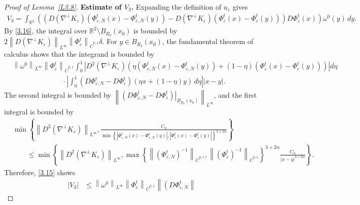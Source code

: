 \documentclass[reqno,centertags,12pt]{amsart}
\theoremstyle{definition}
\numberwithin{equation}{section}
\newcommand{\abs}[1]{\left\lvert#1\right\rvert}
\newcommand{\norm}[1]{\left\|#1\right\|}
\newcommand{\set}[1]{\left\{ #1 \right\}}
\newcommand{\bbR}{{\mathbb{R}}}
\newcommand{\eps}{\varepsilon}
\begin{document}
\begin{proof}[Proof of Lemma~\ref{L3.8}]
    \textbf{Estimate of $V_{3}$.} Expanding the definition of $u_{\eps}$ gives
    \begin{align*}
        V_{3} = \int_{\bbR^{2}}\left(\left(
            D(\nabla^{\perp}K_{\eps})
            (\Phi_{\eps,N}^{t}(x) - \Phi_{\eps,N}^{t}(y))
            - D(\nabla^{\perp}K_{\eps})
            (\Phi_{\eps}^{t}(x) - \Phi_{\eps}^{t}(y))
        \right)D\Phi_{\eps}^{t}(x)\right)
        \omega^{0}(y)\,dy.
    \end{align*}
    By \eqref{3.16}, the integral over $\bbR^{2}\setminus B_{R_{\delta}}(x_{0})$ is bounded by
    $2\norm{D(\nabla^{\perp}K_{\eps})}_{L^{\infty}}\norm{\Phi_{\eps}^{t}}_{\dot{C}^{0,1}}\delta$.
    For $y\in B_{R_{\delta}}(x_{0})$, the fundamental theorem of calculus shows that
    the integrand is bounded by
    \begin{align*}
        &\norm{\omega^{0}}_{L^{\infty}}\norm{\Phi_{\eps}^{t}}_{\dot{C}^{0,1}}
        \int_{0}^{1}\abs{D^{2}(\nabla^{\perp}K_{\eps})
        (\eta(\Phi_{\eps,N}^{t}(x) - \Phi_{\eps,N}^{t}(y))
        + (1-\eta)(\Phi_{\eps}^{t}(x) - \Phi_{\eps}^{t}(y)))}d\eta
        \\&\qquad\qquad\qquad\quad
        \cdot\abs{\int_{0}^{1}\left(D\Phi_{\eps,N}^{t} - D\Phi_{\eps}^{t}\right)
        (\eta x + (1-\eta)y)\,d\eta}\abs{x - y}.
    \end{align*}
    The second integral is bounded by
    $\norm{\left.\left(D\Phi_{\eps,N}^{t}
    - D\Phi_{\eps}^{t}\right)\right|_{B_{R_{\delta}}(x_{0})}}_{L^{\infty}}$, and
    the first integral is bounded by
    \begin{align*}
        &\min\set{
            \norm{D^{2}(\nabla^{\perp}K_{\eps})}_{L^{\infty}},
            \frac{C_{\alpha}}
            {\min\set{
                \abs{\Phi_{\eps,N}^{t}(x) - \Phi_{\eps,N}^{t}(y)},
                \abs{\Phi_{\eps}^{t}(x) - \Phi_{\eps}^{t}(y)}
            }^{3+2\alpha}}
        }
        \\&\quad\quad
        \leq \min\set{
            \norm{D^{2}(\nabla^{\perp}K_{\eps})}_{L^{\infty}},
            \max\set{
                \norm{(\Phi_{\eps,N}^{t})^{-1}}_{\dot{C}^{0,1}},
                \norm{(\Phi_{\eps}^{t})^{-1}}_{\dot{C}^{0,1}}
            }^{3+2\alpha}
            \frac{C_{\alpha}}{\abs{x - y}^{3+2\alpha}}
        }.
    \end{align*}
    Therefore, \eqref{3.15} shows
    \begin{align*}
        \abs{V_{3}} &\leq
        \norm{\omega^{0}}_{L^{\infty}}\norm{\Phi_{\eps}^{t}}_{\dot{C}^{0,1}}
        \norm{\left.\left(D\Phi_{\eps,N}^{t}
}
\end{align*}
\end{proof}
\end{document}
